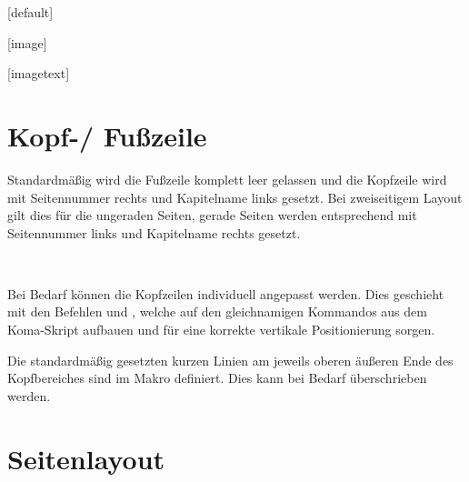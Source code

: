 \begin{center}
  \begin{minipage}[t]{0.33\textwidth}
    \centering\sffamily
    [default]
  \end{minipage}%
  \begin{minipage}[t]{0.33\textwidth}
    \centering\sffamily
    [image]
  \end{minipage}%
  \begin{minipage}[t]{0.33\textwidth}
    \centering\sffamily
    [imagetext]
  \end{minipage}

\end{center}

\section{Kopf-/ Fußzeile}

Standardmäßig wird die Fußzeile komplett leer gelassen und die Kopfzeile
wird mit Seitennummer rechts und Kapitelname links gesetzt. Bei zweiseitigem
Layout gilt dies für die ungeraden Seiten, gerade Seiten werden entsprechend
mit Seitennummer links und Kapitelname rechts gesetzt.

\begin{Declaration}
  \\
\end{Declaration}

Bei Bedarf können die Kopfzeilen individuell angepasst werden.
Dies geschieht mit den Befehlen  und , welche
auf den gleichnamigen Kommandos aus dem Koma-Skript aufbauen und für eine
korrekte vertikale Positionierung sorgen.

\begin{Declaration}
\end{Declaration}


Die standardmäßig gesetzten kurzen Linien am jeweils oberen äußeren Ende des
Kopfbereiches sind im Makro  definiert.
Dies kann bei Bedarf überschrieben werden.


\section{Seitenlayout}

